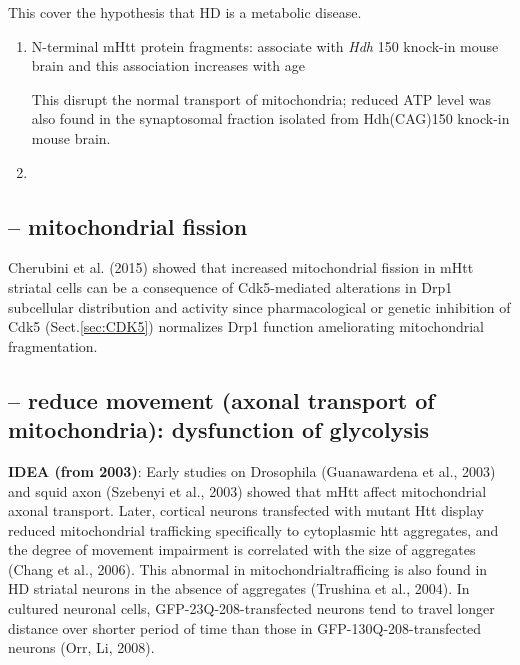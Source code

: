 This cover the hypothesis that HD is a metabolic disease.

\begin{enumerate}
  \item N-terminal mHtt protein fragments: associate with {\it Hdh} 150 knock-in
  mouse brain and this association increases with age
  
  This disrupt the normal transport of mitochondria; reduced ATP level was also
  found in the synaptosomal fraction isolated from Hdh(CAG)150 knock-in mouse
  brain.
  
  \item 
\end{enumerate}

\subsection{-- mitochondrial fission}

Cherubini et al. (2015) showed that increased mitochondrial fission in mHtt
striatal cells can be a consequence of Cdk5-mediated alterations in Drp1
subcellular distribution and activity since pharmacological or genetic
inhibition of Cdk5 (Sect.\ref{sec:CDK5}) normalizes Drp1 function ameliorating
mitochondrial fragmentation.



\subsection{-- reduce movement (axonal transport of mitochondria): dysfunction
of glycolysis}
\label{sec:HD-theory-mitochondria-transport}

{\bf IDEA (from 2003)}: Early studies on Drosophila (Guanawardena et al., 2003)
and squid axon (Szebenyi et al., 2003) showed that mHtt affect mitochondrial
axonal transport. Later, cortical neurons transfected with mutant Htt display
reduced mitochondrial trafficking specifically to cytoplasmic htt aggregates,
and the degree of movement impairment is correlated with the size of aggregates
(Chang et al., 2006). This abnormal in mitochondrialtrafficing is also found in
HD striatal neurons in the absence of aggregates (Trushina et al., 2004).
In cultured neuronal cells, GFP-23Q-208-transfected neurons tend to travel
longer distance over shorter period of time than those in
GFP-130Q-208-transfected neurons (Orr, Li, 2008).

